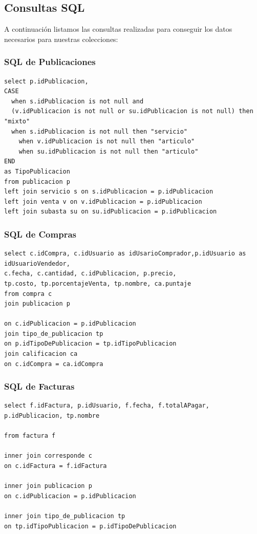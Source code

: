 \documentclass[a4paper, 10pt, twoside]{article}
\begin{document}
\newpage
\subsection{Consultas SQL}

A continuaci\'on listamos las consultas realizadas para conseguir los datos necesarios para nuestras colecciones:
\subsubsection{SQL de Publicaciones}


\begin{verbatim}
select p.idPublicacion,   
CASE
  when s.idPublicacion is not null and 
  (v.idPublicacion is not null or su.idPublicacion is not null) then "mixto"
  when s.idPublicacion is not null then "servicio"
    when v.idPublicacion is not null then "articulo"
    when su.idPublicacion is not null then "articulo"
END
as TipoPublicacion
from publicacion p
left join servicio s on s.idPublicacion = p.idPublicacion
left join venta v on v.idPublicacion = p.idPublicacion
left join subasta su on su.idPublicacion = p.idPublicacion
\end{verbatim}


\subsubsection{SQL de Compras}

\begin{verbatim}
select c.idCompra, c.idUsuario as idUsarioComprador,p.idUsuario as idUsuarioVendedor,
c.fecha, c.cantidad, c.idPublicacion, p.precio,
tp.costo, tp.porcentajeVenta, tp.nombre, ca.puntaje
from compra c 
join publicacion p
 
on c.idPublicacion = p.idPublicacion
join tipo_de_publicacion tp
on p.idTipoDePublicacion = tp.idTipoPublicacion
join calificacion ca 
on c.idCompra = ca.idCompra

\end{verbatim}

\subsubsection{SQL de Facturas}
\begin{verbatim}
select f.idFactura, p.idUsuario, f.fecha, f.totalAPagar, p.idPublicacion, tp.nombre

from factura f

inner join corresponde c
on c.idFactura = f.idFactura

inner join publicacion p
on c.idPublicacion = p.idPublicacion

inner join tipo_de_publicacion tp
on tp.idTipoPublicacion = p.idTipoDePublicacion

\end{verbatim}
\newpage
\end{document}
